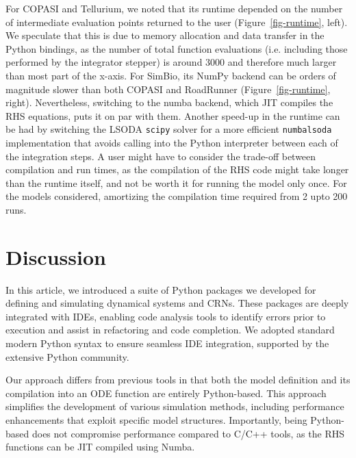 \documentclass[namedate,numsec,webpdf,modern,large]{oup-authoring-template}
\theoremstyle{thmstyleone}%
\theoremstyle{thmstyletwo}%
\theoremstyle{thmstylethree}%
\begin{document}
For COPASI and Tellurium,
we noted that its runtime depended on the number of intermediate evaluation points returned to the user (Figure~\ref{fig-runtime}, left).
We speculate that this is due to memory allocation and data transfer in the Python bindings, 
as the number of total function evaluations (i.e. including those performed by the integrator stepper)
is around 3000 and therefore much larger than most part of the x-axis.
For SimBio,
its NumPy backend can be orders of magnitude slower than both COPASI and RoadRunner  (Figure~\ref{fig-runtime}, right).
Nevertheless, switching to the numba backend,
which \ac{JIT} compiles the \ac{RHS} equations,
puts it on par with them.
Another speed-up in the runtime can be had by switching the LSODA \texttt{scipy} solver
for a more efficient \texttt{numbalsoda} implementation that avoids calling into the Python interpreter
between each of the integration steps.
A user might have to consider the trade-off between compilation and run times,
as the compilation of the \ac{RHS} code might take longer than the runtime itself,
and not be worth it for running the model only once.
For the models considered,
amortizing the compilation time required from 2 upto 200 runs.


\section{Discussion}\label{discussion}

In this article,
we introduced a suite of Python packages we developed
for defining and simulating dynamical systems and \acp{CRN}.
These packages are deeply integrated with \acp{IDE},
enabling code analysis tools to identify errors prior to execution
and assist in refactoring and code completion.
We adopted standard modern Python syntax to ensure seamless IDE integration,
supported by the extensive Python community.

Our approach differs from previous tools in that both the model
definition and its compilation into an \ac{ODE} function are entirely Python-based.
This approach simplifies the development of various simulation methods,
including performance enhancements that exploit specific model structures.
Importantly, being Python-based does not compromise performance compared to C/C++ tools,
as the \ac{RHS} functions can be \ac{JIT} compiled using Numba.
\end{document}
